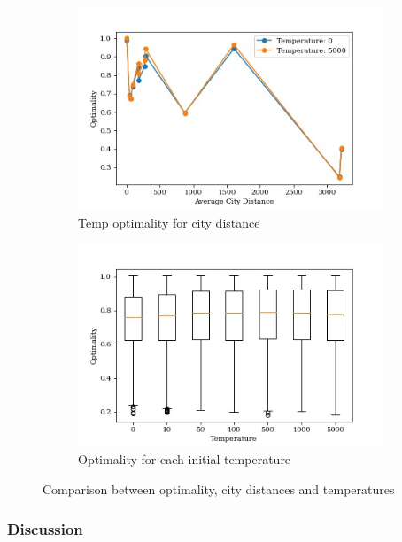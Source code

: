 \documentclass{article}
\begin{document}
\begin{figure}[H]
\centering
    \begin{subfigure}{0.5\textwidth}
        \centering
        \includegraphics[width=0.95\linewidth]{images/tsplib_optimality_city_dist.jpg}
        \caption{Temp optimality for city distance}
        \label{fig:sub1}
    \end{subfigure}%
    \begin{subfigure}{0.5\textwidth}
        \centering  
        \includegraphics[width=0.95\linewidth]{images/tsplib_optimality_temperature.jpg}
        \caption{Optimality for each initial temperature}
        \label{fig:sub2}
    \end{subfigure}
    \caption{Comparison between optimality, city distances and temperatures}
\end{figure}

\subsubsection{Discussion}
\end{document}
